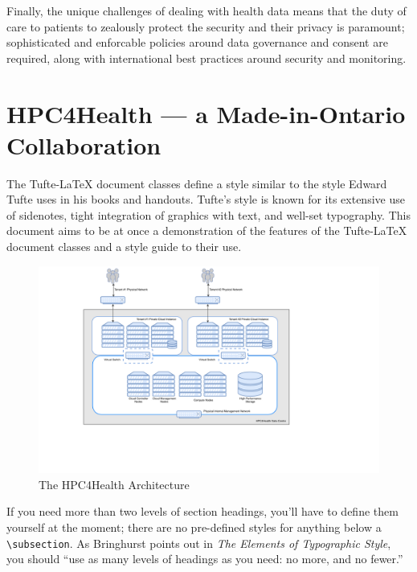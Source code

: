 \documentclass[twoside,symmetric,sfsidenotes,notoc]{tufte-book}
\newcommand{\TL}{Tufte-\LaTeX\xspace}
\begin{document}
Finally, the unique challenges of dealing with health data means that the duty
of care to patients to zealously protect the security and their privacy is
paramount; sophisticated and enforcable policies around data governance and consent
are required, along with international best practices around security and monitoring.

\chapter{HPC4Health --- a Made-in-Ontario Collaboration}
\label{ch:hpc4health}

The \TL document classes define a style similar to the
style Edward Tufte uses in his books and handouts.  Tufte's style is known
for its extensive use of sidenotes, tight integration of graphics with
text, and well-set typography.  This document aims to be at once a
demonstration of the features of the \TL document classes
and a style guide to their use.

\begin{figure}
  \includegraphics{HPC4Health_1.pdf}
  \caption[HPC4Health Architecture Diagram]{The HPC4Health Architecture}
  \label{fig:hpc4health-architecture}
\end{figure}


If you need more than two levels of section headings, you'll have to define
them yourself at the moment; there are no pre-defined styles for anything below
a \Verb|\subsection|.  As Bringhurst points out in \textit{The Elements of
Typographic Style}, you should ``use as many levels of
headings as you need: no more, and no fewer.''
\end{document}
